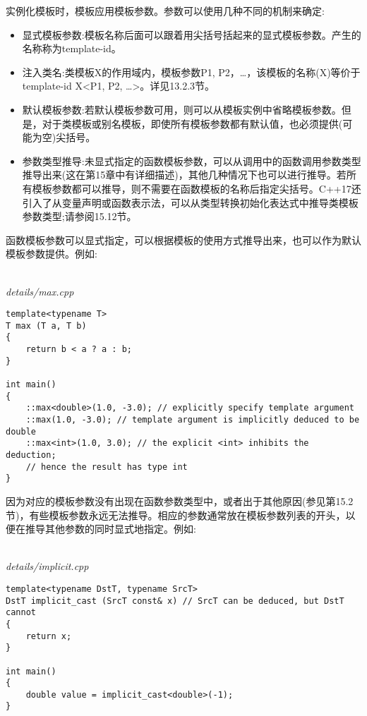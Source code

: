 
实例化模板时，模板应用模板参数。参数可以使用几种不同的机制来确定:

\begin{itemize}
\item 
显式模板参数:模板名称后面可以跟着用尖括号括起来的显式模板参数。产生的名称称为template-id。

\item 
注入类名:类模板X的作用域内，模板参数P1, P2，…，该模板的名称(X)等价于template-id X<P1, P2, …>。详见13.2.3节。

\item 
默认模板参数:若默认模板参数可用，则可以从模板实例中省略模板参数。但是，对于类模板或别名模板，即使所有模板参数都有默认值，也必须提供(可能为空)尖括号。

\item 
参数类型推导:未显式指定的函数模板参数，可以从调用中的函数调用参数类型推导出来(这在第15章中有详细描述)，其他几种情况下也可以进行推导。若所有模板参数都可以推导，则不需要在函数模板的名称后指定尖括号。C++17还引入了从变量声明或函数表示法，可以从类型转换初始化表达式中推导类模板参数类型;请参阅15.12节。
\end{itemize}


函数模板参数可以显式指定，可以根据模板的使用方式推导出来，也可以作为默认模板参数提供。例如:

\hspace*{\fill} \\ %
\noindent
\textit{details/max.cpp}
\begin{lstlisting}[style=styleCXX]
template<typename T>
T max (T a, T b)
{
	return b < a ? a : b;
}

int main()
{
	::max<double>(1.0, -3.0); // explicitly specify template argument
	::max(1.0, -3.0); // template argument is implicitly deduced to be double
	::max<int>(1.0, 3.0); // the explicit <int> inhibits the deduction;
	// hence the result has type int
}
\end{lstlisting}

因为对应的模板参数没有出现在函数参数类型中，或者出于其他原因(参见第15.2节)，有些模板参数永远无法推导。相应的参数通常放在模板参数列表的开头，以便在推导其他参数的同时显式地指定。例如:

\hspace*{\fill} \\ %
\noindent
\textit{details/implicit.cpp}
\begin{lstlisting}[style=styleCXX]
template<typename DstT, typename SrcT>
DstT implicit_cast (SrcT const& x) // SrcT can be deduced, but DstT cannot
{
	return x;
}

int main()
{
	double value = implicit_cast<double>(-1);
}
\end{lstlisting}

